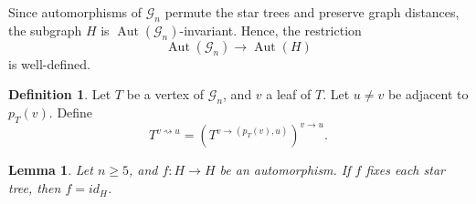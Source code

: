 \documentclass[reqno,dvipsnames]{amsart}
\theoremstyle{plain}
\newtheorem{lemma}[theorem]{Lemma}
\numberwithin{equation}{section}
\theoremstyle{definition}
\newtheorem{definition}[theorem]{Definition}
\DeclareMathOperator{\Aut}{Aut}
\begin{document}
		Since automorphisms of $\mathcal{G}_n$ permute the star trees and preserve graph distances, the subgraph $H$ is $\Aut(\mathcal{G}_n)$-invariant. Hence, the restriction
		\[
			\Aut(\mathcal{G}_n) \to \Aut(H)
		\]
		is well-defined.

		\begin{definition}
			Let $T$ be a vertex of $\mathcal{G}_n$, and $v$ a leaf of $T$. Let $u\neq v$ be adjacent to $p_T(v)$. Define
			\[
				T^{v\rightsquigarrow u} = (T^{v\to (p_T(v),u)})^{v\to u}.
			\]
		\end{definition}

		\begin{lemma} \label{lem:FixStarTrees}
			Let $n\geq 5$, and $f: H\to H$ be an automorphism. If $f$ fixes each star tree, then $f = id_H$.
		\end{lemma}
\end{document}
